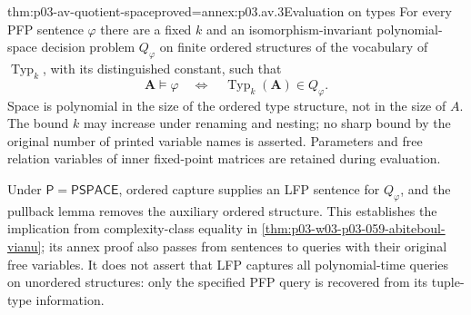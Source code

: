 \begin{hblemma}{thm:p03-av-quotient-space}{proved=annex:p03.av.3}{Evaluation on types}
For every PFP sentence \(\varphi\) there are a fixed \(k\)
and an isomorphism-invariant polynomial-space decision problem
\(Q_\varphi\) on finite ordered structures of the vocabulary
of \(\operatorname{Typ}_k\), with its distinguished constant, such that
\[
 \mathbf A\models\varphi
 \quad\Longleftrightarrow\quad
 \operatorname{Typ}_k(\mathbf A)\in Q_\varphi.
\]
Space is polynomial in the size of the ordered type structure,
not in the size of \(A\). The bound \(k\) may increase under
renaming and nesting; no sharp bound by the original number of
printed variable names is asserted. Parameters and free relation
variables of inner fixed-point matrices are retained during evaluation.
\end{hblemma}

Under \(\mathsf P=\mathsf{PSPACE}\), ordered capture supplies an
LFP sentence for \(Q_\varphi\), and the pullback lemma removes
the auxiliary ordered structure. This establishes the implication from complexity-class equality in
\cref{thm:p03-w03-p03-059-abiteboul-vianu}; its annex proof also
passes from sentences to queries with their original free variables.
It does not assert that LFP captures all polynomial-time queries on
unordered structures: only the specified PFP query is recovered from
its tuple-type information.
